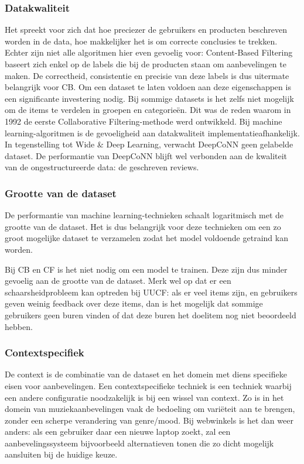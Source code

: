 \subsubsection{Datakwaliteit}
Het spreekt voor zich dat hoe preciezer de gebruikers en producten beschreven worden in de data, hoe makkelijker het is om correcte conclusies te trekken. Echter zijn niet alle algoritmen hier even gevoelig voor: Content-Based Filtering baseert zich enkel op de labels die bij de producten staan om aanbevelingen te maken. De correctheid, consistentie en precisie van deze labels is dus uitermate belangrijk voor CB. Om een dataset te laten voldoen aan deze eigenschappen is een significante investering nodig. Bij sommige datasets is het zelfs niet mogelijk om de items te verdelen in groepen en categorieën. Dit was de reden waarom in 1992 de eerste Collaborative Filtering-methode werd ontwikkeld. \cite{UUCF_original_paper} Bij machine learning-algoritmen is de gevoeligheid aan datakwaliteit implementatieafhankelijk. In tegenstelling tot Wide \& Deep Learning, verwacht DeepCoNN geen gelabelde dataset. De performantie van DeepCoNN blijft wel verbonden aan de kwaliteit van de ongestructureerde data: de geschreven reviews.
\subsubsection{Grootte van de dataset}
De performantie van machine learning-technieken schaalt logaritmisch met de grootte van de dataset. \cite{dataset_size_for_deep_learning} Het is dus belangrijk voor deze technieken om een zo groot mogelijke dataset te verzamelen zodat het model voldoende getraind kan worden.

Bij CB en CF is het niet nodig om een model te trainen. Deze zijn dus minder gevoelig aan de grootte van de dataset. Merk wel op dat er een schaarsheidprobleem kan optreden bij UUCF: als er veel items zijn, en gebruikers geven weinig feedback over deze items, dan is het mogelijk dat sommige gebruikers geen buren vinden of dat deze buren het doelitem nog niet beoordeeld hebben. \cite{cursus_hs9}
\subsubsection{Contextspecifiek}
De context is de combinatie van de dataset en het domein met diens specifieke eisen voor aanbevelingen. Een contextspecifieke techniek is een techniek waarbij een andere configuratie noodzakelijk is bij een wissel van context. Zo is in het domein van muziekaanbevelingen vaak de bedoeling om variëteit aan te brengen, zonder een scherpe verandering van genre/mood. Bij webwinkels is het dan weer anders: als een gebruiker daar een nieuwe laptop zoekt, zal een aanbevelingssysteem bijvoorbeeld alternatieven tonen die zo dicht mogelijk aansluiten bij de huidige keuze.

